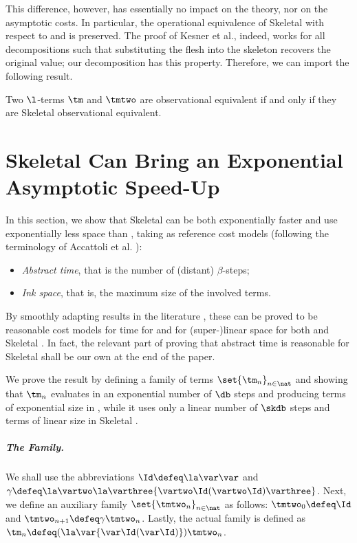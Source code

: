 This difference, however, has essentially no impact on the theory, nor on the asymptotic costs. In particular, the operational equivalence of Skeletal \cbneed with respect to \cbneed and \cbn is preserved. The proof of Kesner et al., indeed, works for all decompositions such that substituting the flesh into the skeleton recovers the original value; our decomposition has this property. Therefore, we can import the following result.

\begin{theorem}
Two $\l$-terms $\tm$ and $\tmtwo$ are \cbn observational equivalent if and only if they are Skeletal \cbneed observational equivalent.
\end{theorem}




\section{Skeletal \cbneed Can Bring an Exponential Asymptotic Speed-Up}
\label{sect:family}
In this section, we show that Skeletal \cbneed can be both exponentially faster and use exponentially less space than \cbneed, taking as reference cost models (following the terminology of Accattoli et al. \cite{DBLP:journals/lmcs/AccattoliLV24}):
\begin{itemize}
\item \emph{Abstract time}, that is the number of (distant) $\beta$-steps;
\item \emph{Ink space}, that is, the maximum size of the involved terms.
\end{itemize}
By smoothly adapting results in the literature \cite{DBLP:conf/birthday/SandsGM02,DBLP:conf/rta/AccattoliL12,DBLP:journals/pacmpl/ForsterKR20}, these can be proved to be reasonable cost models for time for \cbneed and for (super-)linear space for both \cbneed and Skeletal \cbneed. In fact, the relevant part of proving that abstract time is reasonable for Skeletal \cbneed shall be our own  at the end of the paper.

 We prove the result by defining a family of terms $\set{\tm_n}_{n\in\nat}$ and showing that $\tm_n$ evaluates in an exponential number of $\db$ steps and producing terms of exponential size in \cbneed, while it uses only a linear number of $\skdb$ steps and terms of linear size in Skeletal \cbneed.

\subparagraph{The Family.} We shall use the abbreviations $\Id \defeq \la\var\var$ and $\gamma \defeq \la\vartwo\la\varthree{\vartwo \Id (\vartwo \Id) \varthree}$. Next, we define an auxiliary family $\set{\tmtwo_n}_{n\in\nat}$ as follows:
$\tmtwo_0 \defeq \Id$ and $\tmtwo_{n+1} \defeq \gamma \tmtwo_n$.
Lastly, the actual family is defined as $\tm_n \defeq (\la\var{\var \Id (\var \Id)}) \tmtwo_n$.

